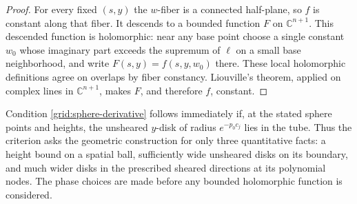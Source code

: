 \begin{proof}
For every fixed $(s,y)$ the $w$-fiber is a connected half-plane,
so $f$ is constant along that fiber.  It descends to a bounded
function $F$ on $\mathbb C^{n+1}$.  This descended function is
holomorphic: near any base point choose a single constant $w_0$
whose imaginary part exceeds the supremum of $\ell$ on a small
base neighborhood, and write $F(s,y)=f(s,y,w_0)$ there.  These
local holomorphic definitions agree on overlaps by fiber
constancy.  Liouville's theorem, applied on complex lines in
$\mathbb C^{n+1}$, makes $F$, and therefore $f$, constant.
\end{proof}

\begin{remark}
\label{grid:geometric-interface}
Condition \eqref{grid:sphere-derivative} follows immediately if,
at the stated sphere points and heights, the unsheared $y$-disk
of radius $e^{-p_0c_j}$ lies in the tube.  Thus the criterion asks
the geometric construction for only three quantitative facts: a
height bound on a spatial ball, sufficiently wide unsheared disks
on its boundary, and much wider disks in the prescribed sheared
directions at its polynomial nodes.  The phase choices are made
before any bounded holomorphic function is considered.
\end{remark}
